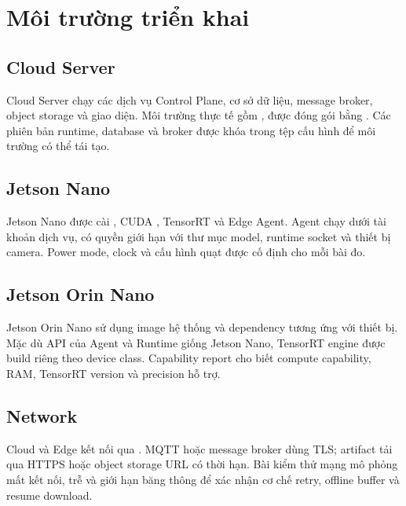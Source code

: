 \section{Môi trường triển khai}

\subsection{Cloud Server}

Cloud Server chạy các dịch vụ Control Plane, cơ sở dữ liệu, message broker,
object storage và giao diện. Môi trường thực tế gồm ,
được đóng gói bằng .
Các phiên bản runtime, database và broker được khóa trong tệp cấu hình để môi
trường có thể tái tạo.

\subsection{Jetson Nano}

Jetson Nano được cài , CUDA , TensorRT
 và Edge Agent. Agent chạy dưới tài khoản dịch vụ, có quyền giới
hạn với thư mục model, runtime socket và thiết bị camera. Power mode, clock và
cấu hình quạt được cố định cho mỗi bài đo.

\subsection{Jetson Orin Nano}

Jetson Orin Nano sử dụng image hệ thống và dependency tương ứng với thiết bị.
Mặc dù API của Agent và Runtime giống Jetson Nano, TensorRT engine được build
riêng theo device class. Capability report cho biết compute capability, RAM,
TensorRT version và precision hỗ trợ.

\subsection{Network}

Cloud và Edge kết nối qua . MQTT hoặc message
broker dùng TLS; artifact tải qua HTTPS hoặc object storage URL có thời hạn. Bài
kiểm thử mạng mô phỏng mất kết nối, trễ và giới hạn băng thông để xác nhận cơ chế
retry, offline buffer và resume download.

